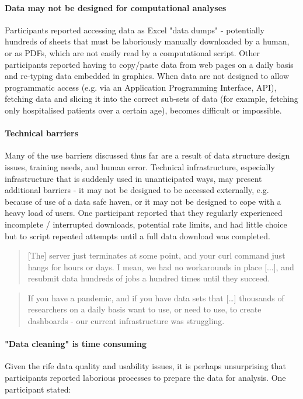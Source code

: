\documentclass{CUP-JNL-DAP}%
\begin{document}
\paragraph{Data may not be designed for computational analyses}

Participants reported accessing data as Excel "data dumps" - potentially hundreds of sheets that must be laboriously manually downloaded by a human, or as PDFs, which are not easily read by a computational script. Other participants reported having to copy/paste data from web pages on a daily basis and re-typing data embedded in graphics. When data are not designed to allow programmatic access (e.g. via an Application Programming Interface, API), fetching data and slicing it into the correct sub-sets of data (for example, fetching only hospitalised patients over a certain age), becomes difficult or impossible. 

\paragraph{Technical barriers} 
Many of the use barriers discussed thus far are a result of data structure design issues, training needs, and human error. Technical infrastructure, especially infrastructure that is suddenly used in unanticipated ways, may present additional barriers - it may not be designed to be accessed externally, e.g. because of use of a data safe haven, or it may not be designed to cope with a heavy load of users. One participant reported that they regularly experienced incomplete / interrupted downloads, potential rate limits, and had little choice but to script repeated attempts until a full data download was completed. 

\blockquote{[The] server just terminates at some point, and your curl command just hangs for hours or days. I mean, we had no workarounds in place [...], and resubmit data hundreds of jobs a hundred times until they succeed.}

\blockquote{If you have a pandemic, and if you have data sets that […] thousands of researchers on a daily basis want to use, or need to use, to create dashboards - our current infrastructure was struggling.}

\paragraph{"Data cleaning" is time consuming} 

Given the rife data quality and usability issues, it is perhaps unsurprising that participants reported laborious processes to prepare the data for analysis. One participant stated: 
\end{document}
